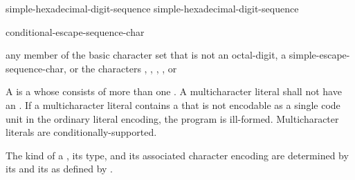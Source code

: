 \begin{bnf}
\br
     simple-hexadecimal-digit-sequence\br
     simple-hexadecimal-digit-sequence \terminal{\}}
\end{bnf}

\begin{bnf}
\br
    \terminal{\textbackslash} conditional-escape-sequence-char
\end{bnf}

\begin{bnf}
\br
    \textnormal{any member of the basic character set that is not an} octal-digit\textnormal{, a} simple-escape-sequence-char\textnormal{, or the characters , , , , or }
\end{bnf}

\pnum
{}%
%
%
%
%
%
%
%
%
%
A  is a 
whose  consists of
more than one .
A multicharacter literal shall not have an .
If a multicharacter literal contains a 
that is not encodable as a single code unit in the ordinary literal encoding,
the program is ill-formed.
Multicharacter literals are conditionally-supported.

\pnum
The kind of a ,
its type, and its associated character encoding
are determined by
its  and its 
as defined by .

